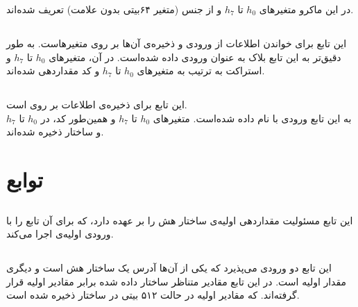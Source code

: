 در این ماکرو متغیرهای ‌$ h_0 $ تا $ h_7 $ و  از جنس (متغیر ۶۴بیتی بدون علامت) تعریف شده‌اند.


\subsection{}
\label{subsec:READ-STATE-BIG}


این تابع برای خواندن اطلاعات از ورودی و ذخیره‌ی ‌‌آن‌ها بر روی متغیرهاست. به طور دقیق‌تر  به این تابع ‌بلاک  به عنوان ورودی داده شده‌است. در آن، متغیرهای $ h_0 $ تا $ h_7 $ و  استراکت به ترتیب به متغیرهای ‌$ h_0 $ تا $ h_7 $ و  کد مقداردهی شده‌اند.

\subsection{}
\label{subsec:WRITE-STATE-BIG}


این تابع برای ذخیره‌ی اطلاعات بر روی  است.\\
به این تابع ورودی   با نام  داده شده‌است. متغیرهای $ h_0 $ تا $ h_7 $ و همین‌طور  کد، در $ h_0 $  تا  $ h_ 7 $ و   ساختار
ذخیره شده‌اند.

\section{ توابع}

\subsection{}
\label{subsec:sph-skein512-init}
این تابع مسئولیت مقداردهی اولیه‌ی ساختار هش را بر عهده دارد، که برای آن تابع \hyperref[subsec:skein-big-init]{} را با ورودی‌ اولیه‌ی  اجرا می‌کند.
\subsection{}
\label{subsec:skein-big-init}

این تابع دو ورودی می‌پذیرد که یکی از آن‌ها آدرس یک ساختار هش است و دیگری مقدار اولیه است. در این تابع مقادیر متناظر ساختار داده شده برابر مقادیر اولیه قرار گرفته‌اند.
که مقادیر اولیه در حالت ۵۱۲ بیتی در ساختار  ذخیره شده ‌است.

\subsection{}
\label{subsec:sph-skein512}

